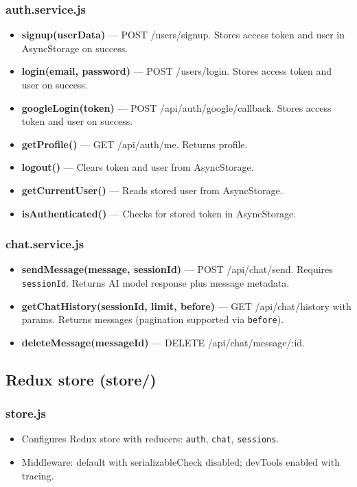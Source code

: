 \documentclass[11pt]{article}
\begin{document}
\subsubsection{auth.service.js}
\begin{itemize}
	\item \textbf{signup(userData)} — POST /users/signup. Stores access token and user in AsyncStorage on success.
	\item \textbf{login(email, password)} — POST /users/login. Stores access token and user on success.
	\item \textbf{googleLogin(token)} — POST /api/auth/google/callback. Stores access token and user on success.
	\item \textbf{getProfile()} — GET /api/auth/me. Returns profile.
	\item \textbf{logout()} — Clears token and user from AsyncStorage.
	\item \textbf{getCurrentUser()} — Reads stored user from AsyncStorage.
	\item \textbf{isAuthenticated()} — Checks for stored token in AsyncStorage.
\end{itemize}

\subsubsection{chat.service.js}
\begin{itemize}
	\item \textbf{sendMessage(message, sessionId)} — POST /api/chat/send. Requires \texttt{sessionId}. Returns AI model response plus message metadata.
	\item \textbf{getChatHistory(sessionId, limit, before)} — GET /api/chat/history with params. Returns messages (pagination supported via \texttt{before}).
	\item \textbf{deleteMessage(messageId)} — DELETE /api/chat/message/:id.
\end{itemize}

\subsection{Redux store (store/)}
\subsubsection{store.js}
\begin{itemize}
	\item Configures Redux store with reducers: \texttt{auth}, \texttt{chat}, \texttt{sessions}.
	\item Middleware: default with serializableCheck disabled; devTools enabled with tracing.
\end{itemize}
\end{document}
